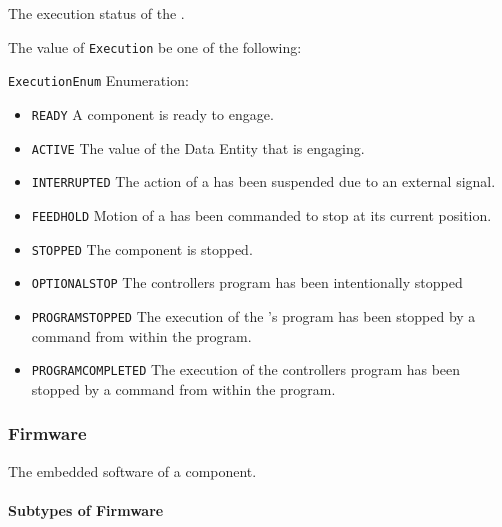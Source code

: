 The execution status of the .


The value of \texttt{Execution} \MUST be one of the following: 


\texttt{ExecutionEnum} Enumeration:

\begin{itemize}
\item \texttt{READY} \newline A component is ready to engage. 
\item \texttt{ACTIVE} \newline The value of the \gls{Data Entity} that is engaging. 
\item \texttt{INTERRUPTED} \newline The action of a  has been suspended due to an external signal. 
\item \texttt{FEED\textunderscore HOLD} \newline Motion of a  has been commanded to stop at its current position. 
\item \texttt{STOPPED} \newline The component is stopped. 
\item \texttt{OPTIONAL\textunderscore STOP} \newline The controllers program has been intentionally stopped 
\item \texttt{PROGRAM\textunderscore STOPPED} \newline The execution of the 's program has been stopped by a command from within the program. 
\item \texttt{PROGRAM\textunderscore COMPLETED} \newline The execution of the controllers program has been stopped by a command from within the program. 
\end{itemize}

\FloatBarrier

\subsubsection{Firmware}
\label{sec:Firmware}



The embedded software of a component.


\paragraph{Subtypes of Firmware}\mbox{}
\label{sec:Subtypes of Firmware}

